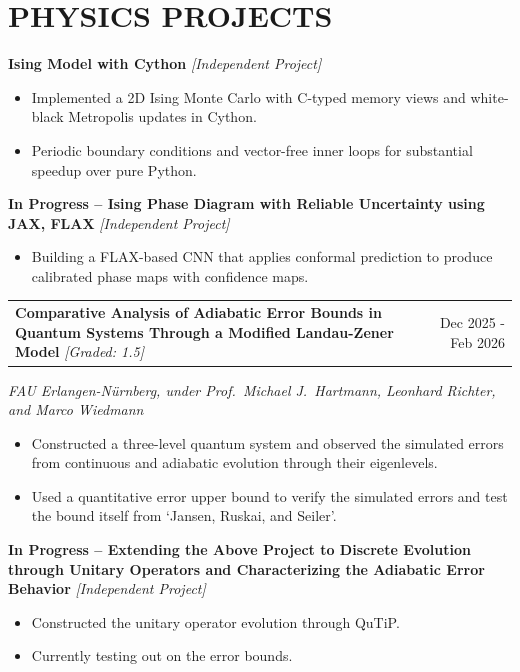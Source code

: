 \documentclass[11pt, a4paper]{article}
\makeatletter
\newcommand{\project}[2]{%
  \noindent\textbf{#1} \textit{[#2]}%
  \vspace{-1pt}
}
\newcommand{\projectdate}[3]{%
  \noindent
  \begin{tabularx}{\linewidth}{@{}X r@{}}
    \textbf{#1} \textit{[#2]} & \small #3
  \end{tabularx}%
  \vspace{1pt}
}
\newenvironment{cvlist}{%
  \begin{itemize}[leftmargin=1.2em, itemsep=0pt, parsep=0pt, topsep=0pt]
}{%
  \end{itemize}
}
\makeatother
\begin{document}
\section{PHYSICS PROJECTS}

\project{Ising Model with Cython}{Independent Project}
\begin{cvlist}
  \item Implemented a 2D Ising Monte Carlo with C-typed memory views and
        white-black Metropolis updates in Cython.
  \item Periodic boundary conditions and vector-free inner loops for
        substantial speedup over pure Python.
\end{cvlist}

\vspace{0pt}

\project{In Progress -- Ising Phase Diagram with Reliable Uncertainty using JAX, FLAX}{Independent Project}
\begin{cvlist}
  \item Building a FLAX-based CNN that applies conformal prediction to produce
        calibrated phase maps with confidence maps.
\end{cvlist}

\vspace{0pt}

\projectdate{Comparative Analysis of Adiabatic Error Bounds in Quantum Systems Through a Modified Landau-Zener Model}
            {Graded: 1.5}
            {Dec 2025 - Feb 2026}

\noindent\textit{FAU Erlangen-Nürnberg, under Prof.\ Michael J.\ Hartmann, Leonhard Richter, and Marco Wiedmann}
\begin{cvlist}
  \item Constructed a three-level quantum system and observed the simulated errors from
        continuous and adiabatic evolution through their eigenlevels.
  \item Used a quantitative error upper bound to verify the simulated errors and test
        the bound itself from `Jansen, Ruskai, and Seiler'.
\end{cvlist}

\vspace{0pt}

\project{In Progress -- Extending the Above Project to Discrete Evolution through Unitary Operators and Characterizing the Adiabatic Error Behavior}{Independent Project}
\begin{cvlist}
  \item Constructed the unitary operator evolution through QuTiP.
  \item Currently testing out on the error bounds.
\end{cvlist}
\vspace{7pt}
\end{document}
